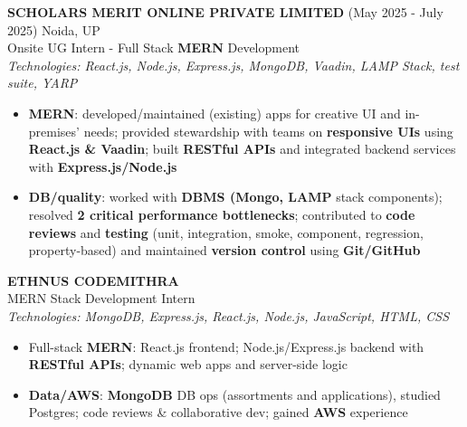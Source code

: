 \documentclass[10pt]{article}
\begin{document}
\textbf{SCHOLARS MERIT ONLINE PRIVATE LIMITED} (May 2025 - July 2025) \hfill Noida, UP\\
Onsite UG Intern - Full Stack \textbf{MERN} Development\\[-3pt]
{\small\textcolor{black!70}{\textit{Technologies: React.js, Node.js, Express.js, MongoDB, Vaadin, LAMP Stack, test suite, YARP}}}\\[-5pt]
\begin{itemize}
  \item \textbf{MERN}: developed/maintained (existing) apps for creative UI and in-premises’ needs; provided stewardship with teams on \textbf{responsive UIs} using \textbf{React.js \& Vaadin}; built \textbf{RESTful APIs} and integrated backend services with \textbf{Express.js/Node.js}
  \item \textbf{DB/quality}: worked with \textbf{DBMS (Mongo, LAMP} stack components); resolved \textbf{2 critical performance bottlenecks}; contributed to \textbf{code reviews} and \textbf{testing} (unit, integration, smoke, component, regression, property-based) and maintained \textbf{version control} using \textbf{Git/GitHub}
\end{itemize}

\textbf{ETHNUS CODEMITHRA}\\
MERN Stack Development Intern\\[-3pt]
{\small\textcolor{black!70}{\textit{Technologies: MongoDB, Express.js, React.js, Node.js, JavaScript, HTML, CSS}}}\\[-5pt]
\begin{itemize}
  \item Full-stack \textbf{MERN}: React.js frontend; Node.js/Express.js backend with \textbf{RESTful APIs}; dynamic web apps and server-side logic
  \item \textbf{Data/AWS}: \textbf{MongoDB} DB ops (assortments and applications), studied Postgres; code reviews \& collaborative dev; gained \textbf{AWS} experience
\end{itemize}
\end{document}
